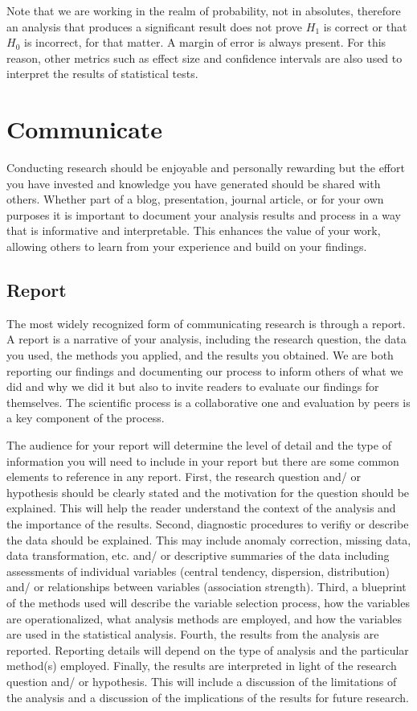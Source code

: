\documentclass[
  letterpaper,
  DIV=11,
  numbers=noendperiod]{scrreprt}
\theoremstyle{definition}
\theoremstyle{remark}
\begin{document}
Note that we are working in the realm of probability, not in absolutes,
therefore an analysis that produces a significant result does not prove
\(H_1\) is correct or that \(H_0\) is incorrect, for that matter. A
margin of error is always present. For this reason, other metrics such
as effect size and confidence intervals are also used to interpret the
results of statistical tests.

\section{Communicate}\label{sec-aa-communicate}

Conducting research should be enjoyable and personally rewarding but the
effort you have invested and knowledge you have generated should be
shared with others. Whether part of a blog, presentation, journal
article, or for your own purposes it is important to document your
analysis results and process in a way that is informative and
interpretable. This enhances the value of your work, allowing others to
learn from your experience and build on your findings.

\subsection{Report}\label{sec-aa-report}

The most widely recognized form of communicating research is through a
report. A report is a narrative of your analysis, including the research
question, the data you used, the methods you applied, and the results
you obtained. We are both reporting our findings and documenting our
process to inform others of what we did and why we did it but also to
invite readers to evaluate our findings for themselves. The scientific
process is a collaborative one and evaluation by peers is a key
component of the process.

The audience for your report will determine the level of detail and the
type of information you will need to include in your report but there
are some common elements to reference in any report. First, the research
question and/ or hypothesis should be clearly stated and the motivation
for the question should be explained. This will help the reader
understand the context of the analysis and the importance of the
results. Second, diagnostic procedures to verifiy or describe the data
should be explained. This may include anomaly correction, missing data,
data transformation, etc. and/ or descriptive summaries of the data
including assessments of individual variables (central tendency,
dispersion, distribution) and/ or relationships between variables
(association strength). Third, a blueprint of the methods used will
describe the variable selection process, how the variables are
operationalized, what analysis methods are employed, and how the
variables are used in the statistical analysis. Fourth, the results from
the analysis are reported. Reporting details will depend on the type of
analysis and the particular method(s) employed. Finally, the results are
interpreted in light of the research question and/ or hypothesis. This
will include a discussion of the limitations of the analysis and a
discussion of the implications of the results for future research.
\end{document}
